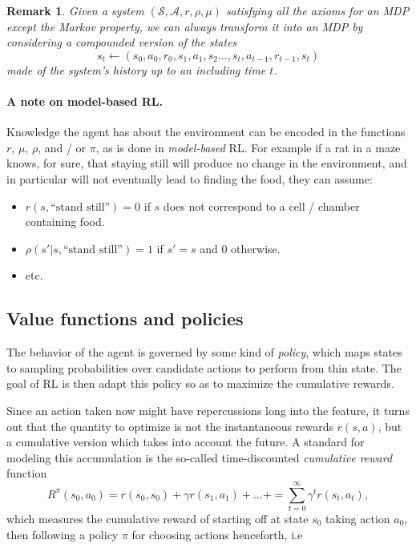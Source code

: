 \documentclass{article} %
\newtheorem{remark}{Remark}
\begin{document}
\begin{remark}
  Given a system $(\mathcal S, \mathcal A, r, \rho, \mu)$ satisfying all the axioms for an MDP
  except the Markov property, we can always transform it into an MDP by considering a compounded
  version of the states
  $$s_t \leftarrow (s_0,a_0,r_0,s_1,a_1,s_2\ldots,s_t,a_{t-1},r_{t-1},s_{t})$$ made of the system's
  history up to an including time $t$.
\end{remark}

\paragraph{A note on model-based RL.}
Knowledge the agent has about the environment can be encoded in the
functions $r$, $\mu$, $\rho$, and / or $\pi$, as is done in
\textit{model-based} RL. For example if a rat in a maze knows, for sure,
that staying still will produce no change in the environment, and in particular will not eventually lead to finding the food, they can assume:
\begin{itemize}
\item $r(s, \text{``stand still''}) = 0$ if $s$ does not correspond to a cell / chamber containing food.
\item $\rho(s'|s,\text{``stand still''}) = 1$ if $s'=s$ and $0$ otherwise.
\item etc.
\end{itemize}

\subsection{Value functions and policies}
The behavior of the agent is governed by some kind of \textit{policy}, which maps states to
sampling probabilities over candidate actions to perform from thin state. The  goal of RL is then
adapt this policy so as to  maximize the cumulative rewards.

Since an action taken now might have repercussions long into the feature, it turns out that the
quantity to optimize is not the instantaneous rewards $r(s, a)$, but a
cumulative version which takes into account the future. A standard for
modeling this accumulation is the so-called
time-discounted \textit{cumulative reward} function
\begin{equation}
  \label{eq:cumr}
  R^\pi(s_0, a_0) = r(s_0, s_0) + \gamma r(s_1, a_1) + \ldots + 
  = \sum_{t=0}^{\infty}\gamma^{t}r(s_{t},a_{t}),
\end{equation}
which measures the cumulative reward of starting off at state $s_0$ taking action $a_0$, then following a policy $\pi$ for choosing actions henceforth,
i.e
\end{document}
